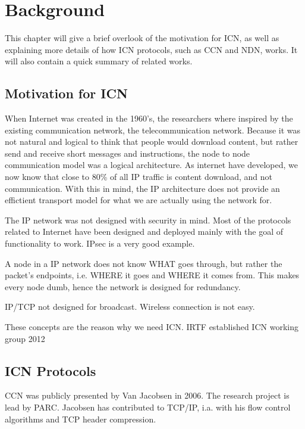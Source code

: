 \chapter{Background}\label{chp:background} 

This chapter will give a brief overlook of the motivation for \gls{ICN},
as well as explaining more details of how \gls{ICN} protocols, such as \gls{CCN} and \gls{NDN}, works. 
It will also contain a quick summary of related works.

\section{Motivation for \gls{ICN}}
When Internet was created in the 1960's, the researchers where inspired by the existing communication network, the telecommunication network.
Because it was not natural and logical to think that people would download content, but rather send and receive short messages and instructions, the node to node communication model was a logical architecture. 
As internet have developed, we now know that close to 80\%  of all \gls{IP} traffic is content download, and not communication. 
With this in mind, the \gls{IP} architecture does not provide an effictient transport model for what we are actually using the network for.

The \gls{IP} network was not designed with security in mind. 
Most of the protocols related to Internet have been designed and deployed mainly with the goal of functionality to work.
\gls{IPsec} is a very good example. 

A node in a \gls{IP} network does not know WHAT goes through, but rather the packet's endpoints, i.e. WHERE it goes and WHERE it comes from. 
This makes every node dumb, hence the network is designed for redundancy.

IP/TCP not designed for broadcast. 
Wireless connection is not easy.

These concepts are the reason why we need \gls{ICN}. 
\gls{IRTF} established \gls{ICN} working group 2012

\section{\gls{ICN} Protocols}\label{chp2:sec:icn}
\gls{CCN} was publicly presented by Van Jacobsen in 2006.
The research project is lead by \gls{PARC}.
Jacobsen has contributed to TCP/IP, i.a. with his flow control algorithms and TCP header compression. 

